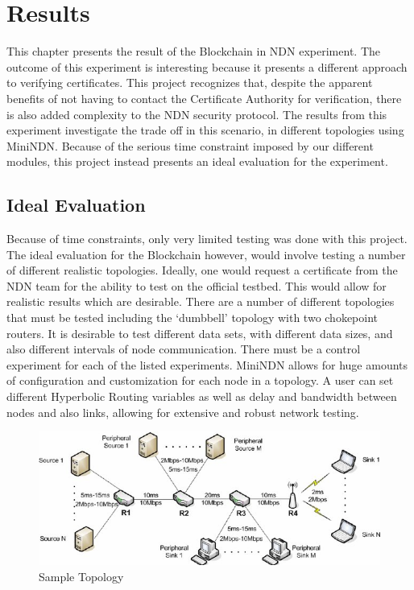 \chapter{Results}
This chapter presents the result of the Blockchain in NDN experiment. The outcome of this experiment is interesting because it presents a different approach to verifying certificates. This project recognizes that, despite the apparent benefits of not having to contact the Certificate Authority for verification, there is also added complexity to the NDN security protocol. The results from this experiment investigate the trade off in this scenario, in different topologies using MiniNDN. Because of the serious time constraint imposed by our different modules, this project instead presents an ideal evaluation for the experiment.
\section{Ideal Evaluation}
Because of time constraints, only very limited testing was done with this project. The ideal evaluation for the Blockchain however, would involve testing a number of different realistic topologies. Ideally, one would request a certificate from the NDN team for the ability to test on the official testbed. This would allow for realistic results which are desirable. There are a number of different topologies that must be tested including the `dumbbell' topology with two chokepoint routers. It is desirable to test different data sets, with different data sizes, and also different intervals of node communication. There must be a control experiment for each of the listed experiments. MiniNDN allows for huge amounts of configuration and customization for each node in a topology. A user can set different Hyperbolic Routing variables as well as delay and bandwidth between nodes and also links, allowing for extensive and robust network testing.
\begin{figure}[ht]
\centering
\includegraphics[scale=0.5]{topology.jpg}
\caption{Sample Topology \cite{057}}
\end{figure}

